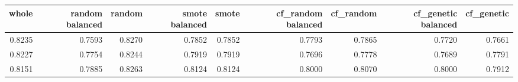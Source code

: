 \begin{tabular}{rrrrrrrrr}
\toprule

 whole &  random balanced &  random &  smote balanced &  smote &  cf\_random balanced &  cf\_random &  cf\_genetic balanced &  cf\_genetic \\
\midrule

0.8235 &           0.7593 &  0.8270 &          0.7852 & 0.7852 &              0.7793 &     0.7865 &               0.7720 &      0.7661 \\
0.8227 &           0.7754 &  0.8244 &          0.7919 & 0.7919 &              0.7696 &     0.7778 &               0.7689 &      0.7791 \\
0.8151 &           0.7885 &  0.8263 &          0.8124 & 0.8124 &              0.8000 &     0.8070 &               0.8000 &      0.7912 \\

\bottomrule
\end{tabular}
